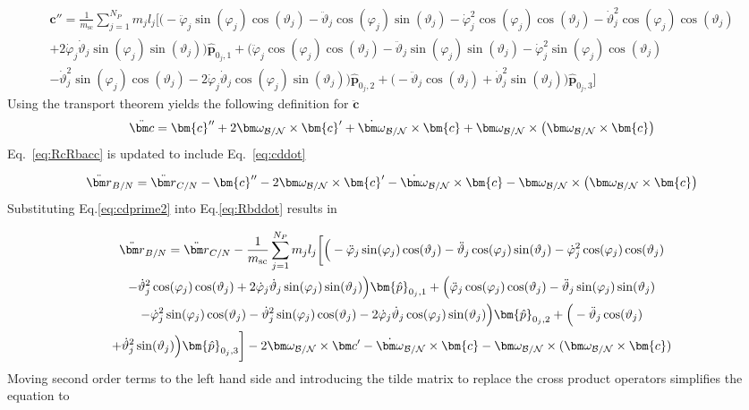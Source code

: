 \begin{multline}
	\bm{c}'' = \frac{1}{m_{\text{sc}}}\sum_{j=1}^{N_{P}}m_j l_j \bigg[
	\Big(-\ddot{\varphi}_j\sin(\varphi_j)\cos(\vartheta_j)-\ddot{\vartheta}_j\cos(\varphi_j)\sin(\vartheta_j)-\dot{\varphi}_j^2\cos(\varphi_j)\cos(\vartheta_j)-\dot{\vartheta}_j^2\cos(\varphi_j)\cos(\vartheta_j)\\+2\dot{\varphi}_j\dot{\vartheta}_j\sin(\varphi_j)\sin(\vartheta_j) \Big)\bm{\hat{p}}_{0_j,1} 
	+\Big(\ddot{\varphi}_j\cos(\varphi_j)\cos(\vartheta_j)-\ddot{\vartheta}_j\sin(\varphi_j)\sin(\vartheta_j)-\dot{\varphi}_j^2\sin(\varphi_j)\cos(\vartheta_j)\\-\dot{\vartheta}_j^2\sin(\varphi_j)\cos(\vartheta_j)-2\dot{\varphi}_j\dot{\vartheta}_j\cos(\varphi_j)\sin(\vartheta_j) \Big)\bm{\hat{p}}_{0_j,2}
	+\Big(-\ddot{\vartheta}_j\cos(\vartheta_j)+\dot{\vartheta}_j^2\sin(\vartheta_j) \Big)\bm{\hat{p}}_{0_j,3}
	\bigg]
	\label{eq:cdprime2}
\end{multline}
Using the transport theorem yields the following definition for $\ddot{\bm c}$
\begin{equation}
	\ddot{\bm c} = \bm{c}'' + 2\bm\omega_{\cal B/N}\times\bm{c}'+\dot{\bm\omega}_{\cal B/N}\times\bm{c}+\bm\omega_{\cal B/N}\times\left(\bm\omega_{\cal B/N}\times\bm{c}\right)
	\label{eq:cddot}
\end{equation}
Eq.~\eqref{eq:RcRbacc} is updated to include Eq.~\eqref{eq:cddot}

\begin{equation}
	\ddot{\bm r}_{B/N} = \ddot{\bm r}_{C/N}-\bm{c}'' - 2\bm\omega_{\cal B/N}\times\bm{c}'-\dot{\bm\omega}_{\cal B/N}\times\bm{c}-\bm\omega_{\cal B/N}\times\left(\bm\omega_{\cal B/N}\times\bm{c}\right)
	\label{eq:Rbddot}
\end{equation}
Substituting Eq.\eqref{eq:cdprime2} into Eq.\eqref{eq:Rbddot} results in

\begin{multline}
	\ddot{\bm r}_{B/N} = \ddot{\bm r}_{C/N}-\frac{1}{m_{\text{sc}}}\sum_{j=1}^{N_{P}}m_j l_j \bigg[
	\Big(-\ddot{\varphi}_j\sin(\varphi_j)\cos(\vartheta_j)-\ddot{\vartheta}_j\cos(\varphi_j)\sin(\vartheta_j)-\dot{\varphi}_j^2\cos(\varphi_j)\cos(\vartheta_j)\\-\dot{\vartheta}_j^2\cos(\varphi_j)\cos(\vartheta_j)+2\dot{\varphi}_j\dot{\vartheta}_j\sin(\varphi_j)\sin(\vartheta_j) \Big)\bm{\hat{p}}_{0_j,1} 
	+\Big(\ddot{\varphi}_j\cos(\varphi_j)\cos(\vartheta_j)-\ddot{\vartheta}_j\sin(\varphi_j)\sin(\vartheta_j)\\-\dot{\varphi}_j^2\sin(\varphi_j)\cos(\vartheta_j)-\dot{\vartheta}_j^2\sin(\varphi_j)\cos(\vartheta_j)-2\dot{\varphi}_j\dot{\vartheta}_j\cos(\varphi_j)\sin(\vartheta_j) \Big)\bm{\hat{p}}_{0_j,2}
	+\Big(-\ddot{\vartheta}_j\cos(\vartheta_j)\\+\dot{\vartheta}_j^2\sin(\vartheta_j) \Big)\bm{\hat{p}}_{0_j,3}
	\bigg]
	- 2\bm\omega_{\cal B/N}\times\bm c'
	-\dot{\bm\omega}_{\cal B/N}\times\bm{c}-\bm\omega_{\cal B/N}\times(\bm\omega_{\cal B/N}\times\bm{c})
	\label{eq:Rbddot2}
\end{multline}
Moving second order terms to the left hand side and introducing the tilde matrix to replace the cross product operators simplifies the equation to

